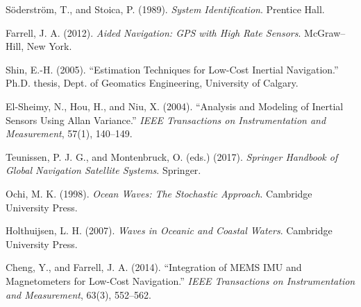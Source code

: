 \documentclass[10pt]{extarticle}
\begin{document}
\begin{thebibliography}{99}
S{\"o}derstr{\"o}m, T., and Stoica, P. (1989).  
\emph{System Identification}.  
Prentice Hall.

Farrell, J. A. (2012).  
\emph{Aided Navigation: GPS with High Rate Sensors}.  
McGraw–Hill, New York.

Shin, E.-H. (2005).  
“Estimation Techniques for Low-Cost Inertial Navigation.”  
Ph.D. thesis, Dept. of Geomatics Engineering, University of Calgary.

El-Sheimy, N., Hou, H., and Niu, X. (2004).  
“Analysis and Modeling of Inertial Sensors Using Allan Variance.”  
\emph{IEEE Transactions on Instrumentation and Measurement}, 57(1), 140–149.

Teunissen, P. J. G., and Montenbruck, O. (eds.) (2017).  
\emph{Springer Handbook of Global Navigation Satellite Systems}.  
Springer.

Ochi, M. K. (1998).  
\emph{Ocean Waves: The Stochastic Approach}.  
Cambridge University Press.

Holthuijsen, L. H. (2007).  
\emph{Waves in Oceanic and Coastal Waters}.  
Cambridge University Press.

Cheng, Y., and Farrell, J. A. (2014).  
“Integration of MEMS IMU and Magnetometers for Low-Cost Navigation.”  
\emph{IEEE Transactions on Instrumentation and Measurement}, 63(3), 552–562.

\end{thebibliography}
\end{document}
